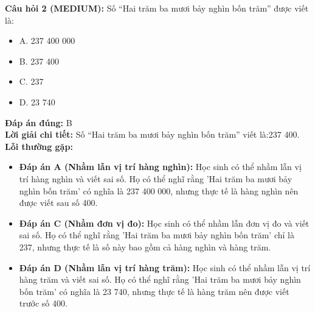 \documentclass{article}
\begin{document}
\begin{minipage}{\textwidth}
\noindent\textbf{Câu hỏi 2 (MEDIUM):} Số “Hai trăm ba mươi bảy nghìn bốn trăm” được viết là: 
\begin{itemize}[label={}]
    \item A. 237 400 000
    \item B. 237 400
    \item C. 237
    \item D. 23 740
\end{itemize}
\textbf{Đáp án đúng:} B \\
\textbf{Lời giải chi tiết:} Số “Hai trăm ba mươi bảy nghìn bốn trăm” viết là:237 400. \\
\textbf{Lỗi thường gặp:}
\begin{itemize}
  \item \textbf{Đáp án A (Nhầm lẫn vị trí hàng nghìn):} Học sinh có thể nhầm lẫn vị trí hàng nghìn và viết sai số. Họ có thể nghĩ rằng 'Hai trăm ba mươi bảy nghìn bốn trăm' có nghĩa là 237 400 000, nhưng thực tế là hàng nghìn nên được viết sau số 400.
  \item \textbf{Đáp án C (Nhầm đơn vị đo):} Học sinh có thể nhầm lẫn đơn vị đo và viết sai số. Họ có thể nghĩ rằng 'Hai trăm ba mươi bảy nghìn bốn trăm' chỉ là 237, nhưng thực tế là số này bao gồm cả hàng nghìn và hàng trăm.
  \item \textbf{Đáp án D (Nhầm lẫn vị trí hàng trăm):} Học sinh có thể nhầm lẫn vị trí hàng trăm và viết sai số. Họ có thể nghĩ rằng 'Hai trăm ba mươi bảy nghìn bốn trăm' có nghĩa là 23 740, nhưng thực tế là hàng trăm nên được viết trước số 400.
\end{itemize}
\end{minipage}
\vspace{1em}
\end{document}
